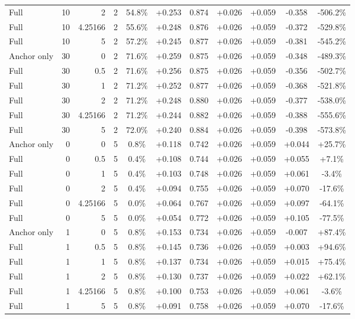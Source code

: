 \begin{table}[htbp]
\begin{tabular}{lrrrccccccc}
Full & 10 & 2 & 2 & 54.8\% & +0.253 & 0.874 & +0.026 & +0.059 & -0.358 & -506.2\% \\
Full & 10 & 4.25166 & 2 & 55.6\% & +0.248 & 0.876 & +0.026 & +0.059 & -0.372 & -529.8\% \\
Full & 10 & 5 & 2 & 57.2\% & +0.245 & 0.877 & +0.026 & +0.059 & -0.381 & -545.2\% \\
Anchor only & 30 & 0 & 2 & 71.6\% & +0.259 & 0.875 & +0.026 & +0.059 & -0.348 & -489.3\% \\
Full & 30 & 0.5 & 2 & 71.6\% & +0.256 & 0.875 & +0.026 & +0.059 & -0.356 & -502.7\% \\
Full & 30 & 1 & 2 & 71.2\% & +0.252 & 0.877 & +0.026 & +0.059 & -0.368 & -521.8\% \\
Full & 30 & 2 & 2 & 71.2\% & +0.248 & 0.880 & +0.026 & +0.059 & -0.377 & -538.0\% \\
Full & 30 & 4.25166 & 2 & 71.2\% & +0.244 & 0.882 & +0.026 & +0.059 & -0.388 & -555.6\% \\
Full & 30 & 5 & 2 & 72.0\% & +0.240 & 0.884 & +0.026 & +0.059 & -0.398 & -573.8\% \\
Anchor only & 0 & 0 & 5 & 0.8\% & +0.118 & 0.742 & +0.026 & +0.059 & +0.044 & +25.7\% \\
Full & 0 & 0.5 & 5 & 0.4\% & +0.108 & 0.744 & +0.026 & +0.059 & +0.055 & +7.1\% \\
Full & 0 & 1 & 5 & 0.4\% & +0.103 & 0.748 & +0.026 & +0.059 & +0.061 & -3.4\% \\
Full & 0 & 2 & 5 & 0.4\% & +0.094 & 0.755 & +0.026 & +0.059 & +0.070 & -17.6\% \\
Full & 0 & 4.25166 & 5 & 0.0\% & +0.064 & 0.767 & +0.026 & +0.059 & +0.097 & -64.1\% \\
Full & 0 & 5 & 5 & 0.0\% & +0.054 & 0.772 & +0.026 & +0.059 & +0.105 & -77.5\% \\
Anchor only & 1 & 0 & 5 & 0.8\% & +0.153 & 0.734 & +0.026 & +0.059 & -0.007 & +87.4\% \\
Full & 1 & 0.5 & 5 & 0.8\% & +0.145 & 0.736 & +0.026 & +0.059 & +0.003 & +94.6\% \\
Full & 1 & 1 & 5 & 0.8\% & +0.137 & 0.734 & +0.026 & +0.059 & +0.015 & +75.4\% \\
Full & 1 & 2 & 5 & 0.8\% & +0.130 & 0.737 & +0.026 & +0.059 & +0.022 & +62.1\% \\
Full & 1 & 4.25166 & 5 & 0.8\% & +0.100 & 0.753 & +0.026 & +0.059 & +0.061 & -3.6\% \\
Full & 1 & 5 & 5 & 0.8\% & +0.091 & 0.758 & +0.026 & +0.059 & +0.070 & -17.6\% \\

\end{tabular}
\end{table}
